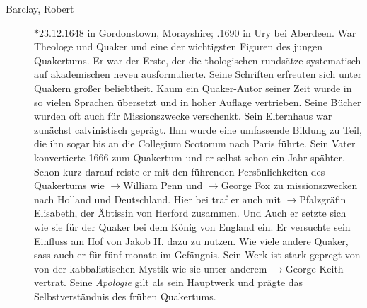 \begin{description}
 \item[Barclay, Robert] $\ast$23.12.1648 in Gordonstown, Morayshire;
.1690 in Ury bei Aberdeen. War Theologe und Quaker und eine der
wichtigsten Figuren des jungen Quakertums. Er war der Erste, der die
thologischen rundsätze systematisch auf akademischen neveu ausformulierte. Seine
Schriften erfreuten sich unter Quakern großer beliebtheit. Kaum ein Quaker-Autor
seiner Zeit wurde in so vielen Sprachen übersetzt und in hoher Auflage
vertrieben. Seine Bücher wurden oft auch für Missionszwecke verschenkt. Sein
Elternhaus war zunächst calvinistisch geprägt. Ihm wurde eine umfassende Bildung
zu Teil, die ihn sogar bis an die Collegium Scotorum nach Paris führte. Sein
Vater konvertierte 1666 zum Quakertum und er selbst schon ein Jahr spähter.
Schon kurz darauf reiste er mit den führenden Persönlichkeiten des Quakertums
wie $\to$William Penn und $\to$George Fox zu missionszwecken nach Holland und
Deutschland. Hier bei traf er auch mit $\to$Pfalzgräfin Elisabeth, der Äbtissin
von Herford zusammen. Und Auch er setzte sich wie sie für der Quaker bei dem
König von England ein. Er versuchte sein Einfluss am Hof von Jakob II. dazu zu
nutzen. Wie viele andere Quaker, sass auch er für fünf monate im Gefängnis. Sein
Werk ist stark gepregt von von der kabbalistischen Mystik wie sie unter anderem
$\to$George Keith vertrat. Seine \textit{Apologie} gilt als sein Hauptwerk und
prägte das Selbstverständnis des frühen Quakertums.  


\end{description}
